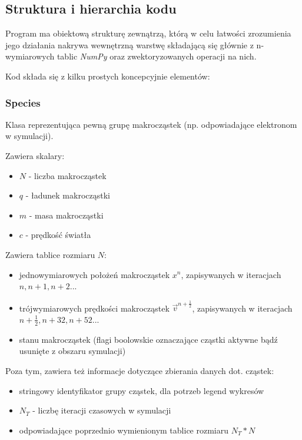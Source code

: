     \subsection{Struktura i hierarchia kodu}

    Program ma obiektową strukturę zewnątrzą, którą w celu łatwości zrozumienia jego działania nakrywa wewnętrzną warstwę
    składającą się głównie z n-wymiarowych tablic \emph{NumPy} oraz zwektoryzowanych operacji na nich.

    Kod składa się z kilku prostych koncepcyjnie elementów:

    \subsubsection{Species}
    Klasa reprezentująca pewną grupę makrocząstek (np. odpowiadające elektronom w symulacji).

    Zawiera skalary:
    \begin{itemize}
        \item $N$ - liczba makrocząstek
        \item $q$ - ładunek makrocząstki
        \item $m$ - masa makrocząstki
        \item $c$ - prędkość światła
    \end{itemize}

    Zawiera tablice rozmiaru $N$:
    \begin{itemize}
        \item jednowymiarowych położeń makrocząstek $x^n$, zapisywanych w iteracjach $n, n+1, n+2$...
        \item trójwymiarowych prędkości makrocząstek $\vec{v}^{n+\frac{1}{2}}$, zapisywanych w iteracjach $n+\frac{1}{2}, n+{3}{2}, n+{5}{2}$...
        \item stanu makrocząstek (flagi boolowskie oznaczające cząstki aktywne bądź usunięte z obszaru symulacji)
    \end{itemize}

    Poza tym, zawiera też informacje dotyczące zbierania danych dot. cząstek:
    \begin{itemize}
        \item stringowy identyfikator grupy cząstek, dla potrzeb legend wykresów
        \item $N_T$ - liczbę iteracji czasowych w symulacji
        \item odpowiadające poprzednio wymienionym tablice rozmiaru $N_T * N$
    \end{itemize}

